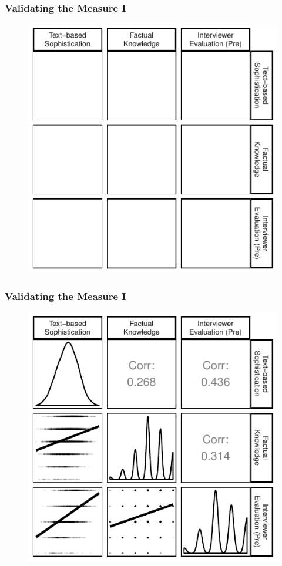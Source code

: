 \documentclass{beamer}
\begin{document}
\begin{frame} %
\frametitle{Validating the Measure I}
  \begin{figure}
  \includegraphics{../fig/corplot_empty.pdf}
  \end{figure}
\end{frame}
\begin{frame} %
\frametitle{Validating the Measure I}
  \begin{figure}
  \includegraphics{../fig/corplot_pres.pdf}
  \end{figure}
\end{frame}
\end{document}
